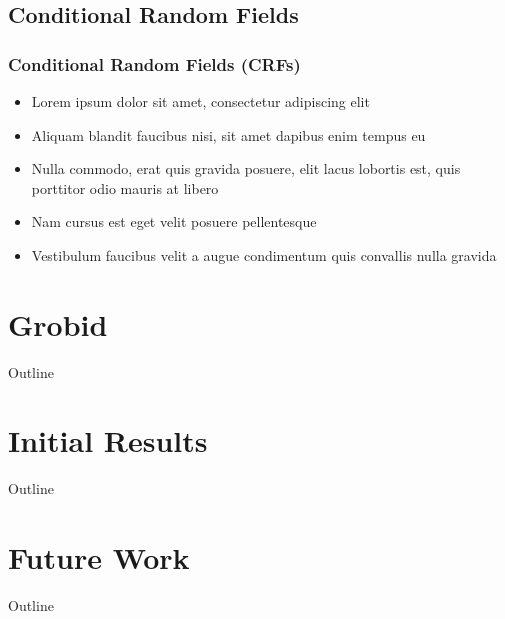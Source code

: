 \documentclass{beamer}
\begin{document}

\subsection{Conditional Random Fields}
\begin{frame}
\frametitle{Conditional Random Fields (CRFs)}
\begin{itemize}
\item Lorem ipsum dolor sit amet, consectetur adipiscing elit
\item Aliquam blandit faucibus nisi, sit amet dapibus enim tempus eu
\item Nulla commodo, erat quis gravida posuere, elit lacus lobortis est, quis porttitor odio mauris at libero
\item Nam cursus est eget velit posuere pellentesque
\item Vestibulum faucibus velit a augue condimentum quis convallis nulla gravida
\end{itemize}
\end{frame}


\section{Grobid}
\begin{frame}[noframenumbering]{Outline}
\tableofcontents[currentsection]
\end{frame}


\section{Initial Results}
\begin{frame}[noframenumbering]{Outline}
\tableofcontents[currentsection]
\end{frame}


\section{Future Work}
\begin{frame}[noframenumbering]{Outline}
\tableofcontents[currentsection]
\end{frame}

\end{document}
